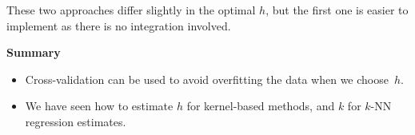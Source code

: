 \documentclass[
  a4paper,
]{article}
\providecommand{\tightlist}{%
  \setlength{\itemsep}{0pt}\setlength{\parskip}{0pt}}
\theoremstyle{definition}
\theoremstyle{definition}
\theoremstyle{definition}
\theoremstyle{definition}
\theoremstyle{remark}
\begin{document}
These two approaches differ slightly in the optimal \(h\), but the first one is
easier to implement as there is no integration involved.

\textbf{Summary}

\begin{itemize}
\tightlist
\item
  Cross-validation can be used to avoid overfitting the data when we choose~\(h\).
\item
  We have seen how to estimate \(h\) for kernel-based methods,
  and \(k\) for \(k\)-NN regression estimates.
\end{itemize}

\clearpage
\end{document}
